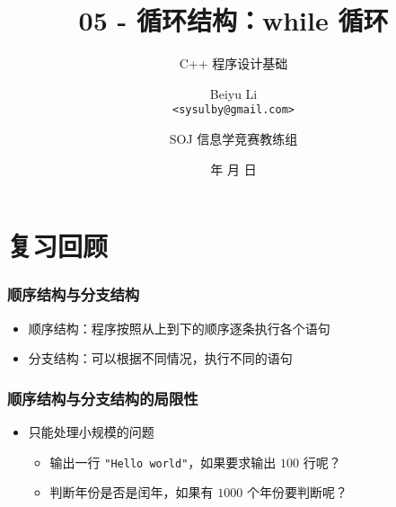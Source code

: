 \title[05 - 循环结构：while 循环]
{05 - 循环结构：while 循环}

\subtitle{C++ 程序设计基础}

\author[Beiyu Li]
{Beiyu Li\\
\texttt{<sysulby@gmail.com>}}


\date[\today]
{\number\year 年 \number\month 月 \number\day 日}




\author[sysulby]
{SOJ 信息学竞赛教练组}

\begin{frame}
    \titlepage
\end{frame}
\setcounter{framenumber}{0} %


\section{复习回顾}

\begin{frame}[fragile]
    \frametitle{顺序结构与分支结构}

    \begin{itemize}[<+->]
        \item 顺序结构：程序按照从上到下的顺序逐条执行各个语句
        \item 分支结构：可以根据不同情况，执行不同的语句
    \end{itemize}
\end{frame}

\begin{frame}[fragile]
    \frametitle{顺序结构与分支结构的局限性}

    \begin{itemize}[<+->]
        \item 只能处理小规模的问题

            \begin{itemize}
                \item 输出一行 \lstinline|"Hello world"|，如果要求输出 $100$ 行呢？
                \item 判断年份是否是闰年，如果有 $1000$ 个年份要判断呢？
            \end{itemize}

    \end{itemize}
\end{frame}

